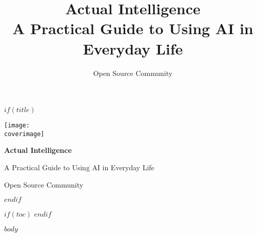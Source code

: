 \documentclass[12pt,a4paper]{book}
\title{\Huge Actual Intelligence\\\large A Practical Guide to Using AI in Everyday Life}
\author{Open Source Community}
\date{\builddate}
\newcommand{\coverimage}{$cover-image$}
\newcommand{\makecovertitle}{
  \begin{titlepage}
    \centering
    \texttt{[image: \\coverimage]}
  \end{titlepage}
  \newpage
  \thispagestyle{empty}
  \begin{center}
    \vspace*{2cm}
    {\Huge \textbf{Actual Intelligence}}\par
    \vspace{1cm}
    {\Large A Practical Guide to Using AI in Everyday Life}\par
    \vspace{2cm}
    {\large Open Source Community}\par
    \vspace{1cm}
  \end{center}
  \newpage
}
\newcommand{\makecovertitle}{
  \maketitle
}
\begin{document}
$if(title)$
\makecovertitle
$endif$

$if(toc)$
\tableofcontents
\clearpage
$endif$

$body$
\end{document}
